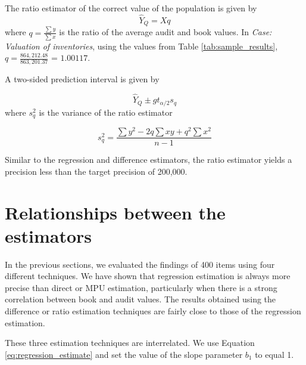 \bigskip
The ratio estimator of the correct value of the population is given by
\begin{equation}
\hat{Y}_Q = X q
\label{eq:ratio_estimator}
\end{equation}
where $q = \frac{\sum{y}}{\sum{x}}$ is the ratio of the average audit and book values. In \emph{Case: Valuation of inventories}, using the values from Table \ref{tab:sample_results}, $q = \frac{864,212.48}{863,201.37}$ = $1.00117$.

\bigskip
A two-sided prediction interval is given by

\begin{equation}
\hat{Y}_Q \pm g t_{\alpha/2} s_q
\label{eq:pred_interval_ratio}
\end{equation}
where $s_q^2$ is the variance of the ratio estimator

\begin{equation}
s_q^2 = \frac{\sum{y^2} - 2q\sum{xy} + q^2\sum{x^2}}{n - 1}
\label{eq:sd_ratios}
\end{equation}

\bigskip


Similar to the regression and difference estimators, the ratio estimator yields a precision less than the target precision of 200,000.



\section{Relationships between the estimators} %
\label{sec:relationships_between_the_estimators}

In the previous sections, we evaluated the findings of 400 items using four different techniques. We have shown that regression estimation is always more precise than direct or MPU estimation, particularly when there is a strong correlation between book and audit values. The results obtained using the difference or ratio estimation techniques are fairly close to those of the regression estimation. 

These three estimation techniques are interrelated. We use Equation \ref{eq:regression_estimate} and set the value of the slope parameter $b_1$ to equal 1.

